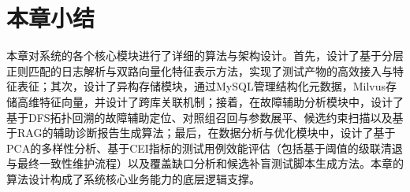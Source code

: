 \section{本章小结}

本章对系统的各个核心模块进行了详细的算法与架构设计。首先，设计了基于分层正则匹配的日志解析与双路向量化特征表示方法，实现了测试产物的高效接入与特征表征；其次，设计了异构存储模块，通过MySQL管理结构化元数据，Milvus存储高维特征向量，并设计了跨库关联机制；接着，在故障辅助分析模块中，设计了基于DFS拓扑回溯的故障辅助定位、对照组召回与参数展平、候选约束扫描以及基于RAG的辅助诊断报告生成算法；最后，在数据分析与优化模块中，设计了基于PCA的多样性分析、基于CEI指标的测试用例效能评估（包括基于阈值的级联清退与最终一致性维护流程）以及覆盖缺口分析和候选补盲测试脚本生成方法。本章的算法设计构成了系统核心业务能力的底层逻辑支撑。